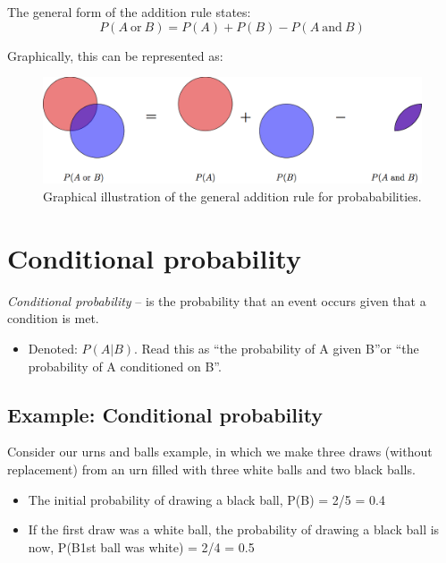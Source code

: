 \documentclass[]{book}
\providecommand{\tightlist}{%
  \setlength{\itemsep}{0pt}\setlength{\parskip}{0pt}}
\theoremstyle{definition}
\theoremstyle{definition}
\theoremstyle{definition}
\theoremstyle{remark}
\begin{document}
The general form of the addition rule states: \[
  P(A\ \text{or}\ B) = P(A) + P(B) - P(A\ \text{and}\ B)
\]

Graphically, this can be represented as:

\begin{figure}

{\centering \includegraphics[width=0.75\linewidth]{./figures/fig-probability-addition-rule} 

}

\caption{Graphical illustration of the general addition rule for probababilities.}\label{fig:unnamed-chunk-355}
\end{figure}

\hypertarget{conditional-probability}{%
\section{Conditional probability}\label{conditional-probability}}

\emph{Conditional probability} -- is the probability that an event
occurs given that a condition is met.

\begin{itemize}
\tightlist
\item
  Denoted: \(P(A|B)\). Read this as ``the probability of A given B''or
  ``the probability of A conditioned on B''.
\end{itemize}

\hypertarget{example-conditional-probability}{%
\subsection{Example: Conditional
probability}\label{example-conditional-probability}}

Consider our urns and balls example, in which we make three draws
(without replacement) from an urn filled with three white balls and two
black balls.

\begin{itemize}
\item
  The initial probability of drawing a black ball, P(B) = 2/5 = 0.4
\item
  If the first draw was a white ball, the probability of drawing a black
  ball is now, P(B\textbar{}1st ball was white) = 2/4 = 0.5
\end{itemize}
\end{document}
